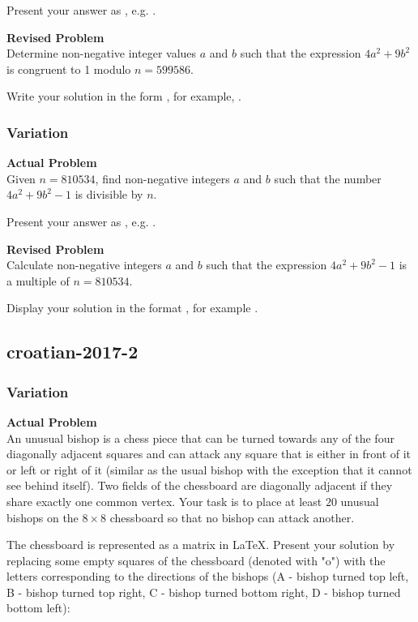 Present your answer as , e.g. .

\textbf{Revised Problem}\\
Determine non-negative integer values $a$ and $b$ such that the expression $4a^2 + 9b^2$ is congruent to 1 modulo $n = 599586$.

Write your solution in the form , for example, .

\subsubsection{Variation}
\textbf{Actual Problem}\\
Given $n = 810534$, find non-negative integers $a$ and $b$ such that the number $4a^2 + 9b^2 - 1$ is divisible by $n$.

Present your answer as , e.g. .

\textbf{Revised Problem}\\
Calculate non-negative integers \(a\) and \(b\) such that the expression \(4a^2 + 9b^2 - 1\) is a multiple of \(n = 810534\).

Display your solution in the format , for example .

\subsection{croatian-2017-2}
\subsubsection{Variation}
\textbf{Actual Problem}\\
An unusual bishop is a chess piece that can be turned towards any of the four diagonally adjacent squares and can attack any square that is either in front of it or left or right of it (similar as the usual bishop with the exception that it cannot see behind itself).
Two fields of the chessboard are diagonally adjacent if they share exactly one common vertex. Your task is to place at least $20$ unusual bishops on the $8 \times 8$ chessboard so that no bishop can attack another.

The chessboard is represented as a matrix in LaTeX. 
Present your solution by replacing some empty squares of the chessboard (denoted with "o") with the letters corresponding to the directions of the bishops (A - bishop turned top left, B - bishop turned top right, C - bishop turned bottom right, D - bishop turned bottom left):


